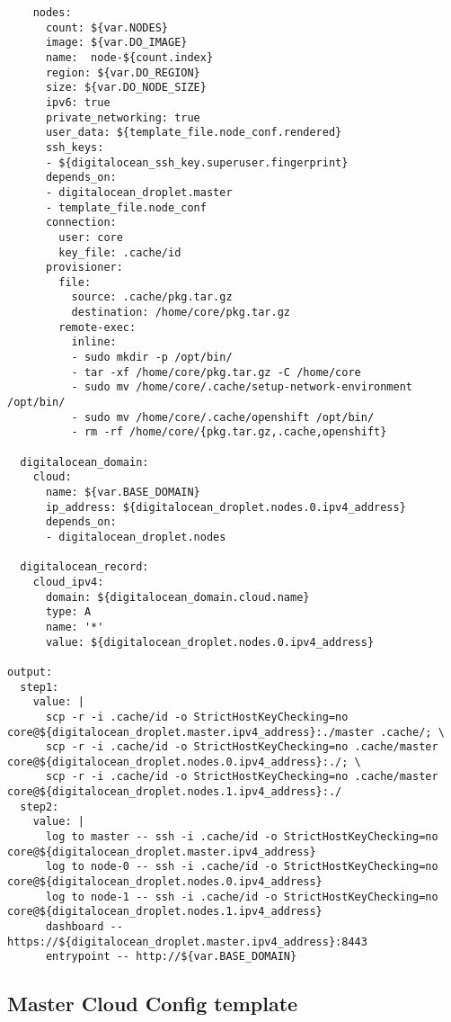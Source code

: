 \begin{verbatim}
    nodes:
      count: ${var.NODES}
      image: ${var.DO_IMAGE}
      name:  node-${count.index}
      region: ${var.DO_REGION}
      size: ${var.DO_NODE_SIZE}
      ipv6: true
      private_networking: true
      user_data: ${template_file.node_conf.rendered}
      ssh_keys:
      - ${digitalocean_ssh_key.superuser.fingerprint}
      depends_on:
      - digitalocean_droplet.master
      - template_file.node_conf
      connection:
        user: core
        key_file: .cache/id
      provisioner:
        file:
          source: .cache/pkg.tar.gz
          destination: /home/core/pkg.tar.gz
        remote-exec:
          inline:
          - sudo mkdir -p /opt/bin/
          - tar -xf /home/core/pkg.tar.gz -C /home/core
          - sudo mv /home/core/.cache/setup-network-environment /opt/bin/
          - sudo mv /home/core/.cache/openshift /opt/bin/
          - rm -rf /home/core/{pkg.tar.gz,.cache,openshift}

  digitalocean_domain:
    cloud:
      name: ${var.BASE_DOMAIN}
      ip_address: ${digitalocean_droplet.nodes.0.ipv4_address}
      depends_on:
      - digitalocean_droplet.nodes

  digitalocean_record:
    cloud_ipv4:
      domain: ${digitalocean_domain.cloud.name}
      type: A
      name: '*'
      value: ${digitalocean_droplet.nodes.0.ipv4_address}

output:
  step1:
    value: |
      scp -r -i .cache/id -o StrictHostKeyChecking=no core@${digitalocean_droplet.master.ipv4_address}:./master .cache/; \
      scp -r -i .cache/id -o StrictHostKeyChecking=no .cache/master core@${digitalocean_droplet.nodes.0.ipv4_address}:./; \
      scp -r -i .cache/id -o StrictHostKeyChecking=no .cache/master core@${digitalocean_droplet.nodes.1.ipv4_address}:./
  step2:
    value: |
      log to master -- ssh -i .cache/id -o StrictHostKeyChecking=no core@${digitalocean_droplet.master.ipv4_address}
      log to node-0 -- ssh -i .cache/id -o StrictHostKeyChecking=no core@${digitalocean_droplet.nodes.0.ipv4_address}
      log to node-1 -- ssh -i .cache/id -o StrictHostKeyChecking=no core@${digitalocean_droplet.nodes.1.ipv4_address}
      dashboard -- https://${digitalocean_droplet.master.ipv4_address}:8443
      entrypoint -- http://${var.BASE_DOMAIN}
\end{verbatim}

\subsection{Master Cloud Config
template}\label{master-cloud-config-template}

